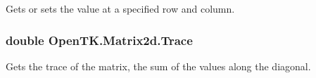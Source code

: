 Gets or sets the value at a specified row and column. 

\hypertarget{struct_open_t_k_1_1_matrix2d_a2619c170f3a0fa088a1bb773c8e4ebbe}{
\subsubsection[{Trace}]{\setlength{\rightskip}{0pt plus 5cm}double Open\-T\-K.\-Matrix2d.\-Trace\hspace{0.3cm}{\ttfamily [get]}}}\label{struct_open_t_k_1_1_matrix2d_a2619c170f3a0fa088a1bb773c8e4ebbe}


Gets the trace of the matrix, the sum of the values along the diagonal. 

